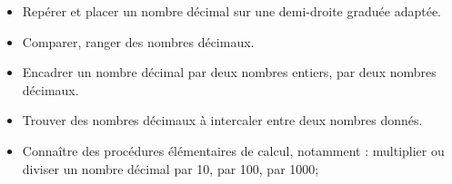 \begin{prerequis}
    \begin{itemize}
       \item Repérer et placer un nombre décimal sur une demi-droite graduée adaptée.
       \item Comparer, ranger des nombres décimaux.
       \item Encadrer un nombre décimal par deux nombres entiers, par deux nombres décimaux.
       \item Trouver des nombres décimaux à intercaler entre deux nombres donnés.
       \item Connaître des procédures élémentaires de calcul, notamment : multiplier ou diviser un nombre décimal par 10, par 100, par 1000;
    \end{itemize}
 \end{prerequis}